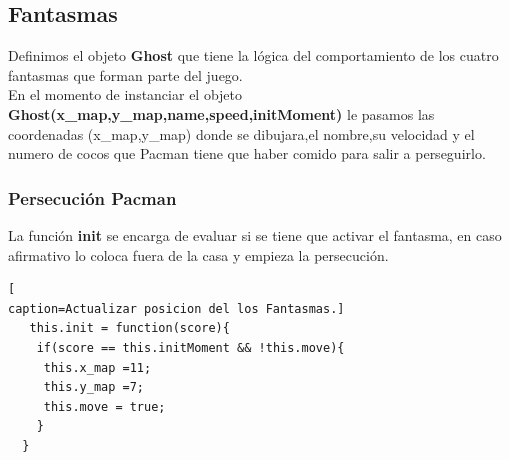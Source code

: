 \subsection{Fantasmas}
Definimos el objeto \textbf{Ghost} que tiene la lógica del comportamiento de los cuatro fantasmas que forman parte del juego.
\\En el momento de instanciar el objeto \textbf{Ghost(x\_map,y\_map,name,speed,initMoment)} le pasamos las coordenadas (x\_map,y\_map) donde se dibujara,el nombre,su velocidad y el numero de cocos que Pacman tiene que haber comido para salir a perseguirlo.
\subsubsection*{Persecución Pacman}
La función \textbf{init} se encarga de evaluar si se tiene que activar el fantasma, en caso afirmativo lo coloca fuera de la casa y empieza la persecución.
\begin{lstlisting}[
caption=Actualizar posicion del los Fantasmas.]
   this.init = function(score){
  	if(score == this.initMoment && !this.move){
     this.x_map =11;
     this.y_map =7;
     this.move = true;
  	}
  }
\end{lstlisting}
